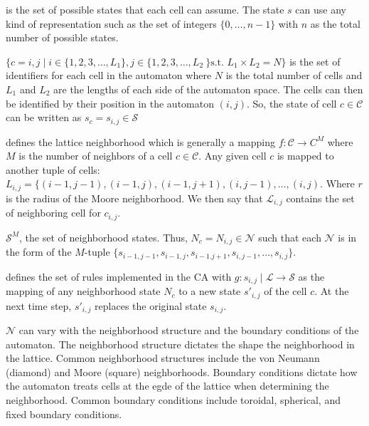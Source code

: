 \begin{CAdef}
    \itemS is the set of possible states that each cell can assume. The state $s$ can use any kind of representation such as the set of integers $\lbrace 0,\ldots,n-1\rbrace$ with $n$ as the total number of possible states.
    
    \itemC $\lbrace c = {i,j} \mid i \in \lbrace 1,2,3,\dots,L_1 \rbrace, j \in \lbrace 1,2,3,\dots,L_2\ \rbrace \text{s.t. } L_1 \times L_2 = N \rbrace$ is the set of identifiers for each cell in the automaton where $N$ is the total number of cells and $L_1$ and $L_2$ are the lengths of each side of the automaton space. The cells can then be identified by their position in the automaton $(i,j)$. So, the state of cell $c \in \mathcal{C}$ can be written as $s_c = s_{i,j} \in \mathcal{S}$
    
    \itemL defines the lattice neighborhood which is generally a mapping $f : \mathcal{C} \rightarrow C^M$ where $M$ is the number of neighbors of a cell $c \in \mathcal{C}$. Any given cell $c$ is mapped to another tuple of cells: $L_{i,j} = \lbrace (i-1,j-1), (i-1, j), (i-1, j+1), (i, j-1), \dots, (i,j)$. Where $r$ is the radius of the Moore neighborhood. We then say that $\mathcal{L}_{i,j}$ contains the set of neighboring cell for $c_{i,j}$.
    
    \itemN $\mathcal{S}^M$, the set of neighborhood states. Thus, $N_c = N_{i,j} \in \mathcal{N}$ such that each $\mathcal{N}$ is in the form of the $M$-tuple $\lbrace s_{i-1,j-1}, s_{i-1, j}, s_{i-1. j+1}, s_{i, j-1}, \dots, s_{i,j} \rbrace$.
    
    \itemR defines the set of rules implemented in the CA with $g : s_{i,j} \mid \mathcal{L} \rightarrow \mathcal{S}$ as the mapping of any neighborhood state $N_c$ to a new state $s'_{i,j}$ of the cell $c$. At the next time step, $s'_{i,j}$ replaces the original state $s_{i,j}$.
\end{CAdef}

$\mathcal{N}$ can vary with the neighborhood structure and the boundary conditions of the automaton. 
The neighborhood structure dictates the shape the neighborhood in the lattice. 
Common neighborhood structures include the von Neumann (diamond) and Moore (square) neighborhoods. 
Boundary conditions dictate how the automaton treats cells at the egde of the lattice when determining the neighborhood. 
Common boundary conditions include toroidal, spherical, and fixed boundary conditions. 

